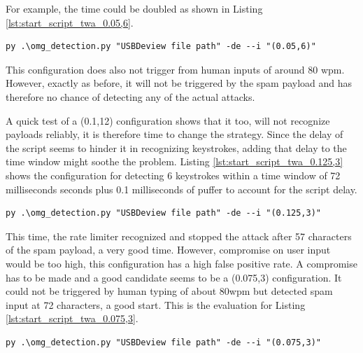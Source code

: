 For example, the time could be doubled as shown in Listing \ref{lst:start_script_twa_0.05,6}.

\begin{lstlisting}[caption={start defence Script with TWA (0.05,6)},label={lst:start_script_twa_0.05,6}, captionpos=b]
 py .\omg_detection.py "USBDeview file path" -de --i "(0.05,6)"
\end{lstlisting}

This configuration does also not trigger from human inputs of around 80 wpm. However, exactly as before, it will not be triggered by the spam payload and has therefore no chance of detecting any of the actual attacks.


A quick test of a (0.1,12) configuration shows that it too, will not recognize payloads reliably, it is therefore time to change the strategy.
Since the delay of the script seems to hinder it in recognizing keystrokes, adding that delay to the time window might soothe the problem. Listing \ref{lst:start_script_twa_0.125,3} shows the configuration for detecting 6 keystrokes within a time window of 72 milliseconds seconds plus 0.1 milliseconds of puffer to account for the script delay. 

\begin{lstlisting}[caption={start defence Script with TWA (0.125,3)},label={lst:start_script_twa_0.125,3}, captionpos=b]
 py .\omg_detection.py "USBDeview file path" -de --i "(0.125,3)"
\end{lstlisting}

This time, the rate limiter recognized and stopped the attack after 57 characters of the spam payload, a very good time. However, compromise on user input would be too high, this configuration has a high false positive rate. A compromise has to be made and a good candidate seems to be a (0.075,3) configuration. It could not be triggered by human typing of about 80wpm but detected spam input at 72 characters, a good start. This is the evaluation for Listing \ref{lst:start_script_twa_0.075,3}. 


\begin{lstlisting}[caption={start defence Script with TWA (0.075,3)},label={lst:start_script_twa_0.075,3}, captionpos=b]
 py .\omg_detection.py "USBDeview file path" -de --i "(0.075,3)"
\end{lstlisting}


